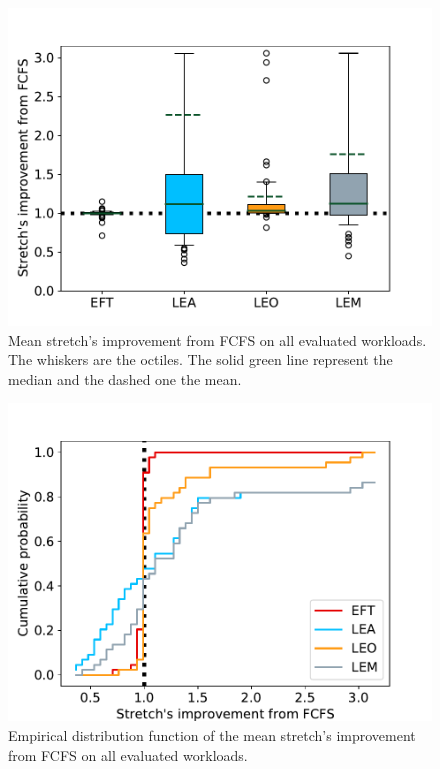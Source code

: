 \documentclass[conference,10pt]{IEEEtran}
\begin{document}
\begin{figure}[t]\centering\includegraphics[width=1\linewidth]{../MBSS/plot/Boxplot/box_plot_mean_stretch_all_workloads.pdf}\caption{Mean stretch's improvement from FCFS on all evaluated workloads. The whiskers are the octiles. The solid green line represent the median and the dashed one the mean.}\label{boxplot.all}\end{figure}
\begin{figure}[t]\centering\includegraphics[width=1\linewidth]{../MBSS/plot/ECDF/ecdf_mean_stretch_all_workloads.pdf}\caption{Empirical distribution function of the mean stretch's improvement from FCFS on all evaluated workloads.}\label{ecdf}\end{figure}
\end{document}
